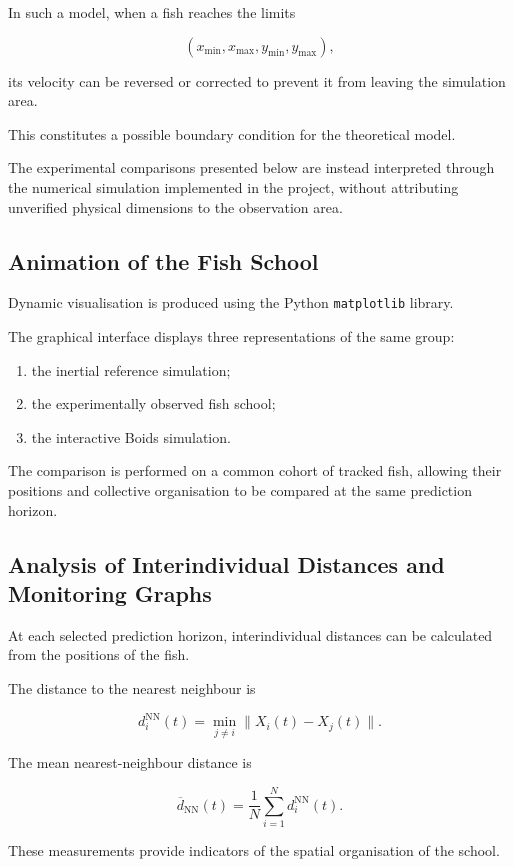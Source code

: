 \documentclass[10pt,a4paper]{article}
\begin{document}
In such a model, when a fish reaches
the limits

\[
(x_{\min},x_{\max},y_{\min},y_{\max}),
\]

its velocity can be reversed or corrected
to prevent it from leaving the simulation area.

This constitutes a possible boundary condition
for the theoretical model.

The experimental comparisons presented below
are instead interpreted through the numerical
simulation implemented in the project,
without attributing unverified physical
dimensions to the observation area.

\subsection{Animation of the Fish School}

Dynamic visualisation is produced using
the Python \texttt{matplotlib} library.

The graphical interface displays three
representations of the same group:

\begin{enumerate}
    \item the inertial reference simulation;
    \item the experimentally observed fish school;
    \item the interactive Boids simulation.
\end{enumerate}

The comparison is performed on a common
cohort of tracked fish, allowing their
positions and collective organisation
to be compared at the same prediction horizon.

\subsection{Analysis of Interindividual Distances
and Monitoring Graphs}

At each selected prediction horizon,
interindividual distances can be calculated
from the positions of the fish.

The distance to the nearest neighbour is

\[
d_i^{\mathrm{NN}}(t)
=
\min_{j\neq i}
\|X_i(t)-X_j(t)\|.
\]

The mean nearest-neighbour distance is

\[
\overline d_{\mathrm{NN}}(t)
=
\frac{1}{N}
\sum_{i=1}^{N}
d_i^{\mathrm{NN}}(t).
\]

These measurements provide indicators
of the spatial organisation of the school.
\end{document}
